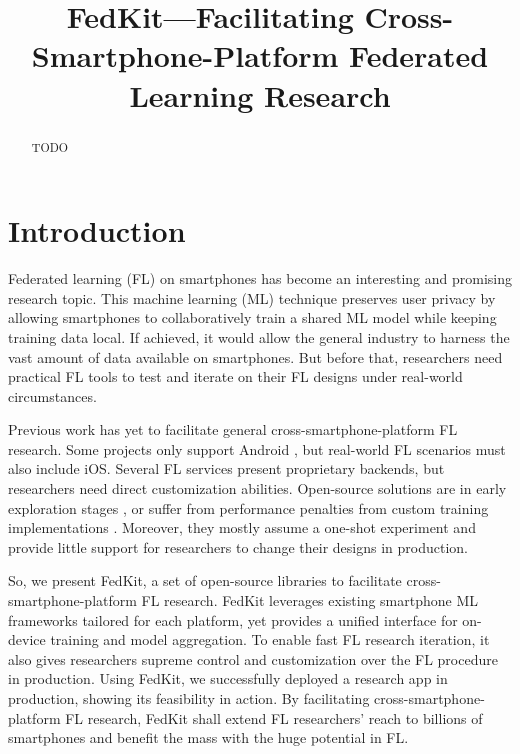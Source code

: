 \documentclass[letterpaper]{article} %
\title{FedKit---Facilitating Cross-Smartphone-Platform Federated Learning Research}
\author{}
\begin{document}
\maketitle

\begin{abstract}
    TODO
\end{abstract}

\section{Introduction}

Federated learning (FL) on smartphones has become an interesting and
promising research topic.
This machine learning (ML) technique preserves user privacy by
allowing smartphones to collaboratively train a shared ML model while
keeping training data local.
If achieved, it would allow the general industry to
harness the vast amount of data available on smartphones.
But before that, researchers need practical FL tools to test and
iterate on their FL designs under real-world circumstances.

Previous work has yet to facilitate general cross-smartphone-platform
FL research.
Some projects only support Android
\cite{he2020fedml,madrigal2023project},
but real-world FL scenarios must also include iOS.
Several FL services present proprietary backends,
but researchers need direct customization abilities.
Open-source solutions are in early exploration stages
\cite{beutel2020flower,mathur2021ondevice},
or suffer from performance penalties from custom training implementations
\cite{ryffel2018generic,Ziller2021,hall2021syft}.
Moreover, they mostly assume a one-shot experiment and
provide little support for researchers to change their designs in production.

So, we present FedKit,
a set of open-source libraries to facilitate
cross-smartphone-platform FL research.
FedKit leverages existing smartphone ML frameworks tailored for each platform,
yet provides a unified interface for on-device training and model aggregation.
To enable fast FL research iteration,
it also gives researchers supreme control and customization over
the FL procedure in production.
Using FedKit, we successfully deployed a research app in production,
showing its feasibility in action.
By facilitating cross-smartphone-platform FL research,
FedKit shall extend FL researchers' reach to billions of smartphones and
benefit the mass with the huge potential in FL.
\end{document}
